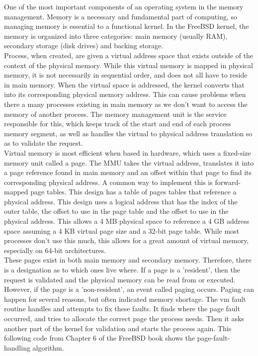 \documentclass[titlepage]{article}
\begin{document}
\begin{singlespace}
One of the most important components of an operating system in the memory management. Memory is a necessary and fundamental part of computing, so managing memory is essential to a functional kernel. In the FreeBSD kernel,  the memory is organized into three categories: main memory (usually RAM), secondary storage (disk drives) and backing storage. \\
Process, when created, are given a virtual address space that exists outside of the context of the physical memory. While this virtual memory is mapped in physical memory, it is not necessarily in sequential order, and does not all have to reside in main memory. When the virtual space is addressed, the kernel converts that into its corresponding physical memory address. This can cause problems when there a many processes existing in main memory as we don't want to access the memory of another process. The memory management unit is the service responsible for this, which keeps track of the start and end of each process memory segment, as well as handles the virtual to physical address translation so as to validate the request. \\
Virtual memory is most efficient when based in hardware, which uses a fixed-size memory unit called a page. The MMU takes the virtual address, translates it into a page reference found in main memory and an offset within that page to find its corresponding physical address. A common way to implement this is forward-mapped page tables. This design has a table of pages tables that reference a physical address. This design uses a logical address that has the index of the outer table, the offset to use in the page table and the offset to use in the physical address. This allows a 4 MB physical space to reference a 4 GB address space assuming a 4 KB virtual page size and a 32-bit page table. While most processes don't use this much, this allows for a great amount of virtual memory, especially on 64-bit architectures. \\
These pages exist in both main memory and secondary memory. Therefore, there is a designation as to which ones live where. If a page is a 'resident', then the request is validated and the physical memory can be read from or executed. However, if the page is a 'non-resident', an event called paging occurs. Paging can happen for several reasons, but often indicated memory shortage. The vm fault routine handles and attempts to fix these faults. It finds where the page fault occurred, and tries to allocate the correct page the process needs. Then it asks another part of the kernel for validation and starts the process again. This following code from Chapter 6 of the FreeBSD book \cite{freebsdch6} shows the page-fault-handling algorithm. \\


\end{singlespace}
\end{document}
